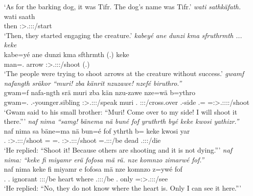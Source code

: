 \begin{exe}
	\trans `As for the barking dog, it was Tifr. The dog's name was Tifr.'
	\emph{wati sathkäfath.}\\
	\gll wati saath\\ 
	then \Stpl:\Sbj>\Tsg.\Masc:\Obj:\Pst:\Ipfv/start\\
	\trans `Then, they started engaging the creature.'
	\emph{kabeyé ane dunzi kma sfruthrmth ... keke}\\
	\gll kabe=yé ane dunzi kma sfthrmth (.) keke\\ 
	man=\Erg.{\Nsg} {\Dem} arrow {\Pot} \Stpl:\Sbj>\Tsg.\Masc:\Obj:\Pst:\Dur/shoot (.) \Neg\\
	\trans `The people were trying to shoot arrows at the creature without success.'
	\emph{gwamf nafangth sräkor ``muri! zba känrit nzuzawe! nzefé biruthro.''}\\
	\gll gwam=f nafa-ngth srä muri zba kän nzu-zawe nze=wä b=ythro\\ 
	gwam=\Erg.{\Sg} \Third.\Poss-younger.sibling \Stsg:\Sbj>\Tsg.\Masc:\Obj:\Irr:\Pfv/speak muri \Prox.{\Abl} \Ssg:\Sbj:\Imp:\Pfv/cross.over \Fsg.\Poss-side \Fsg.\Erg={\Emph} \Med=\Sg:\Sbj>\Tsg.\Masc:\Obj:\Nonpast:\Ipfv:\Andat/shoot\\
	\trans `Gwam said to his small brother: ``Muri! Come over to my side! I will shoot it there.'''
	\emph{naf nima ``samg! bänema nä buné fof yruthrth byé keke kwosi yathizr.''}\\
	\gll naf nima sa bäne=ma {nä bun=é} fof ythrth b= keke kwosi yar\\ 
	\Tsg.{\Erg} {\Quot} \Ssg:\Sbj>\Tsg.\Masc:\Obj:\Imp:\Pfv/shoot \Recog={\Char} \Indf=\Erg.{\Nsg} {\Emph} \Stpl:\Sbj>\Tsg.\Masc:\Obj:\Nonpast:\Ipfv/shoot \Med=\Tsg.\Masc:\Sbj:\Nonpast:\Ipfv/be {\Neg} dead \Tsg.\Masc:\Sbj:\Nonpast:\Ipfv/die\\
	\trans `He replied: ``Shoot it! Because others are shooting and it is not dying.'''
	\emph{naf nima: ``keke fi miyamr erä fofosa mä rä. nze komnzo zimarwé fof.''}\\
	\gll naf nima keke fi miyamr e fofosa mä  nze komnzo z=ywé fof\\ 
	\Tsg.{\Erg} {\Quot} {\Neg} \Third.{\Abs} ignorant \Stpl:\Sbj:\Nonpast:\Ipfv/be heart where \Tsg.\F:\Sbj:\Nonpast:\Ipfv/be \Fsg.{\Erg} only \Prox=\Fsg:\Sbj>\Tsg.\Masc:\Obj:\Nonpast:\Ipfv/see {\Emph}\\
	\trans `He replied: ``No, they do not know where the heart is. Only I can see it here.'''

\end{exe}
